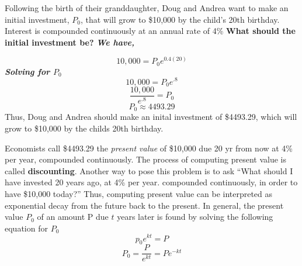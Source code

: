 \documentclass{report}
\begin{document}
\pagebreak
\q
Following the birth of their granddaughter, Doug and Andrea want to make an initial investment, $P_0$, that will grow to \$10,000 by the child's 20th birthday. Interest is compounded continuously at an annual rate of 4\%
\bigbreak \noindent
\textbf{What should the initial investment be?}
\bigbreak \noindent
\textit{\textbf{We have,}}

$$10,000 = P_0e^{0.4(20)}$$
\textit{\textbf{Solving for $P_0$}}
$$ 10,000 = P_0e^{.8}$$
$$ \dfrac{10,000}{e^{.8}} = P_0$$
$$ P_0 \approx 4493.29$$
Thus, Doug and Andrea should make an inital investment of \$4493.29, which will grow to \$10,000 by the childs 20th birthday.
\begin{figure}[ht]
    \centering
\end{figure}
\bigbreak \noindent
Economists call \$4493.29 the \textit{present value} of \$10,000 due 20 yr from now at 4\% per year, compounded continuously. The process of computing present value is called \textbf{discounting}. Another way to pose this problem is to ask ``What should I have invested 20 years ago, at 4\% per year. compounded continuously, in order to have \$10,000 today?''
\bigbreak \noindent
Thus, computing present value can be interpreted as exponential decay from the future back to the present.
\bigbreak \noindent
In general, the present value $P_0$ of an amount P due $t$ years later is found by solving the following equation for $P_0$
$$ p_0e^{kt} = P$$
$$ P_0 = \dfrac{P}{e^{kt}} = Pe^{-kt}$$
\bigbreak \noindent
{}

\pagebreak
\end{document}
